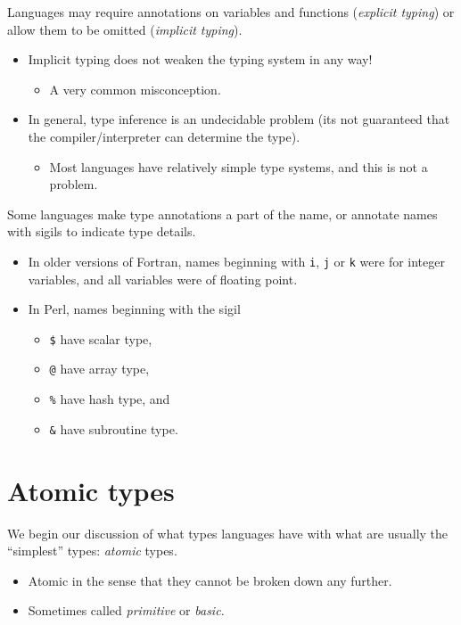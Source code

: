 \documentclass[11pt]{article}
\theoremstyle{definition}
\begin{document}
Languages may require annotations on variables and functions
(\emph{explicit typing}) or allow them to be omitted (\emph{implicit typing}).
\begin{itemize}
\item Implicit typing does not weaken the typing system in any way!
\begin{itemize}
\item A very common misconception.
\end{itemize}
\item In general, type inference is an undecidable problem
(its not guaranteed that the compiler/interpreter can
determine the type).
\begin{itemize}
\item Most languages have relatively simple type systems,
and this is not a problem.
\end{itemize}
\end{itemize}

Some languages make type annotations a part of the name,
or annotate names with sigils to indicate type details.
\begin{itemize}
\item In older versions of Fortran, names beginning with
\texttt{i}, \texttt{j} or \texttt{k} were for integer variables,
and all variables were of floating point.
\item In Perl, names beginning with the sigil
\begin{itemize}
\item \texttt{\$} have scalar type,
\item \texttt{@} have array type,
\item \texttt{\%} have hash type, and
\item \texttt{\&} have subroutine type.
\end{itemize}
\end{itemize}

\section{Atomic types}
\label{sec:org94a4e65}

We begin our discussion of what types languages have
with what are usually the “simplest” types: \emph{atomic} types.
\begin{itemize}
\item Atomic in the sense that they cannot be broken down any further.
\item Sometimes called \emph{primitive} or \emph{basic}.
\end{itemize}
\end{document}
